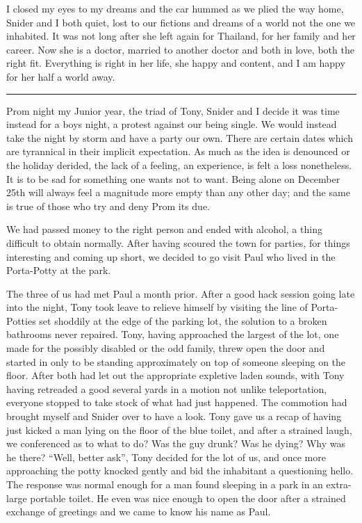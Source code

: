 \documentclass[ebook, 10pt, openright, onecolumn]{memoir}
\newcommand*\starbreak{\fancybreak*{\Large{* * *}}}
\begin{document}
I closed my eyes to my dreams and the car hummed as we plied the way home,
Snider and I both quiet, lost to our fictions and dreams of a world not the one
we inhabited.  It was not long after she left again for Thailand, for her family
and her career.  Now she is a doctor, married to another doctor and both in
love, both the right fit.  Everything is right in her life, she happy and
content, and I am happy for her half a world away.

\starbreak

Prom night my Junior year, the triad of Tony, Snider and I decide it was time
instead for a boys night, a protest against our being single.  We would instead
take the night by storm and have a party our own.  There are certain dates which
are tyrannical in their implicit expectation.  As much as the idea is denounced
or the holiday derided, the lack of a feeling, an experience, is felt a loss
nonetheless.  It is to be sad for something one wants not to want.  Being alone
on December 25th will always feel a magnitude more empty than any other day; and
the same is true of those who try and deny Prom its due.

We had passed money to the right person and ended with alcohol, a thing
difficult to obtain normally.  After having scoured the town for parties, for
things interesting and coming up short, we decided to go visit Paul who lived in
the Porta-Potty at the park.

The three of us had met Paul a month prior.  After a good hack session going
late into the night, Tony took leave to relieve himself by visiting the line of
Porta-Potties set shoddily at the edge of the parking lot, the solution to a
broken bathrooms never repaired.  Tony, having approached the largest of the
lot, one made for the possibly disabled or the odd family, threw open the door
and started in only to be standing approximately on top of someone sleeping on
the floor.  After both had let out the appropriate expletive laden sounds, with
Tony having retreaded a good several yards in a motion not unlike teleportation,
everyone stopped to take stock of what had just happened.  The commotion had
brought myself and Snider over to have a look.  Tony gave us a recap of having
just kicked a man lying on the floor of the blue toilet, and after a strained
laugh, we conferenced as to what to do?  Was the guy drunk?  Was he dying?  Why
was he there?  ``Well, better ask'', Tony decided for the lot of us, and once
more approaching the potty knocked gently and bid the inhabitant a questioning
hello.  The response was normal enough for a man found sleeping in a park in an
extra-large portable toilet.  He even was nice enough to open the door after a
strained exchange of greetings and we came to know his name as Paul.
\end{document}
